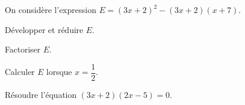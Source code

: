 On considère l'expression $E = (3x + 2)^2 - (3x + 2)(x + 7)$.
\begin{myenumerate}
\item Développer et réduire $E$.
\item Factoriser $E$.
\item Calculer $E$ lorsque $x = \dfrac12$.
\item Résoudre l'équation $(3x + 2)(2x -5) =0$.
\end{myenumerate}